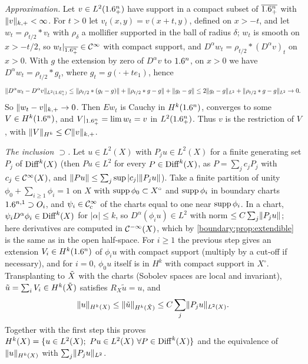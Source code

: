 \emph{Approximation.} Let $v\in L^2(1.6^n_+)$ have support in a compact subset of
$\overline{1.6^n_+}$ with $\lVert v\rVert_{k,+}<\infty$. For $t>0$ let $v_t(x,y)=v(x+t,y)$, defined
on $x>-t$, and let $w_t=\rho_{t/2}*v_t$ with $\rho_\delta$ a mollifier supported in the ball
of radius $\delta$; $w_t$ is smooth on $x>-t/2$, so $w_t|_{\overline{1.6^n_+}}\in\mathcal{C}^\infty$ with
compact support, and $D^\alpha w_t=\rho_{t/2}*(D^\alpha v)_t$ on $x>0$. With $g$ the
extension by zero of $D^\alpha v$ to $1.6^n$, on $x>0$ we have $D^\alpha w_t=\rho_{t/2}*g_t$,
where $g_t=g(\cdot+te_1)$, hence
\begin{equation*}
\lVert D^\alpha w_t-D^\alpha v\rVert_{L^2(1.6^n_+)}\le\lVert \rho_{t/2}*(g_t-g)\rVert+
\lVert \rho_{t/2}*g-g\rVert+\lVert g_t-g\rVert\le2\lVert g_t-g\rVert_{L^2}+\lVert \rho_{t/2}*g-g\rVert_{L^2}\to0 .
\end{equation*}
So $\lVert w_t-v\rVert_{k,+}\to0$. Then $Ew_t$ is Cauchy in $H^k(1.6^n)$, converges to some
$V\in H^k(1.6^n)$, and $V|_{1.6^n_+}=\lim w_t=v$ in $L^2(1.6^n_+)$. Thus $v$ is the
restriction of $V$, with $\lVert V\rVert_{H^k}\le C\lVert v\rVert_{k,+}$.

\emph{The inclusion $\supset$.} Let $u\in L^2(X)$ with $P_ju\in L^2(X)$ for a finite
generating set $P_j$ of $\operatorname{Diff}^{k}(X)$ (then $Pu\in L^2$ for every $P\in\operatorname{Diff}^{k}(X)$, as
$P=\sum_jc_jP_j$ with $c_j\in\mathcal{C}^\infty(X)$, and $\lVert Pu\rVert\le\sum_j\sup|c_j|\lVert P_ju\rVert$). Take a
finite partition of unity $\phi_0+\sum_{i\ge1}\phi_i=1$ on $X$ with $\operatorname{supp}\phi_0\subset X^\circ$
and $\operatorname{supp}\phi_i$ in boundary charts $1.6^{n,1}\supset O_i$, and $\psi_i\in\mathcal{C}^\infty_{\mathrm{c}}$ of the
charts equal to one near $\operatorname{supp}\phi_i$. In a chart, $\psi_iD^\alpha\phi_i\in\operatorname{Diff}^{k}(X)$ for
$|\alpha|\le k$, so $D^\alpha(\phi_iu)\in L^2$ with norm $\le C\sum_j\lVert P_ju\rVert$; here
derivatives are computed in $\mathcal{C}^{-\infty}(X)$, which by \cref{boundary:prop:extendible} is the same
as in the open half-space. For $i\ge1$ the previous step gives an extension
$V_i\in H^k(1.6^n)$ of $\phi_iu$ with compact support (multiply by a cut-off if
necessary), and for $i=0$, $\phi_0u$ itself is in $H^k$ with compact support in $X^\circ$.
Transplanting to $\tilde{X}$ with the charts (Sobolev spaces are local and invariant), $\tilde u=
\sum_iV_i\in H^k(\tilde{X})$ satisfies $R_X\tilde u=u$, and
\begin{equation*}
\lVert u\rVert_{H^k(X)}\le\lVert \tilde u\rVert_{H^k(\tilde{X})}\le C\sum_j\lVert P_ju\rVert_{L^2(X)} .
\end{equation*}
Together with the first step this proves $H^k(X)=\{u\in L^2(X);\ Pu\in L^2(X)\ \forall
P\in\operatorname{Diff}^{k}(X)\}$ and the equivalence of $\lVert u\rVert_{H^k(X)}$ with $\sum_j\lVert P_ju\rVert_{L^2}$.

